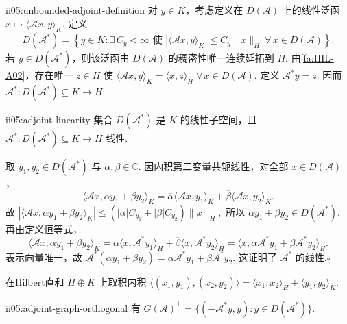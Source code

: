 \begin{FADefinition}[A][无界Hilbert伴随]{ii05:unbounded-adjoint-definition}
对 \(\displaystyle y\in K\)，考虑定义在 \(\displaystyle D(\mathcal A)\) 上的线性泛函
\(\displaystyle x\longmapsto\langle\mathcal Ax,y\rangle_K.\)
定义
\[
D(\mathcal A^*)
=
\left\{
y\in K:
\exists\,C_y<\infty\text{ 使 }
|\langle\mathcal Ax,y\rangle_K|
\leqslant
C_y\|x\|_H
\ \forall\,x\in D(\mathcal A)
\right\}.
\]
若 \(\displaystyle y\in D(\mathcal A^*)\)，则该泛函由 \(\displaystyle D(\mathcal A)\) 的稠密性唯一连续延拓到 \(\displaystyle H\). 由\autoref{fa:HIL-A02}，存在唯一 \(\displaystyle z\in H\) 使
\(\displaystyle \langle\mathcal Ax,y\rangle_K = \langle x,z\rangle_H \;\forall\,x\in D(\mathcal A).\)
定义 \(\displaystyle\mathcal A^*y=z\). 因而
\(\displaystyle \mathcal A^*:D(\mathcal A^*)\subseteq K\to H.\)
\end{FADefinition}

\begin{FAProposition}[C][伴随定义域与线性结构]{ii05:adjoint-linearity}
集合 \(\displaystyle D(\mathcal A^*)\) 是 \(\displaystyle K\) 的线性子空间，且 \(\displaystyle\mathcal A^*:D(\mathcal A^*)\subseteq K\to H\) 线性.
\end{FAProposition}

\begin{FAProof}
取 \(\displaystyle y_1,y_2\in D(\mathcal A^*)\) 与 \(\displaystyle\alpha,\beta\in\mathbb C\). 因内积第二变量共轭线性，对全部 \(\displaystyle x\in D(\mathcal A)\)，
\[
\langle\mathcal Ax,\alpha y_1+\beta y_2\rangle_K
=
\overline\alpha\langle\mathcal Ax,y_1\rangle_K
+
\overline\beta\langle\mathcal Ax,y_2\rangle_K.
\]
故
\(\displaystyle |\langle\mathcal Ax,\alpha y_1+\beta y_2\rangle_K| \leqslant (|\alpha|C_{y_1}+|\beta|C_{y_2})\|x\|_H,\)
所以 \(\displaystyle\alpha y_1+\beta y_2\in D(\mathcal A^*)\). 再由定义恒等式，
\[
\langle\mathcal Ax,\alpha y_1+\beta y_2\rangle_K
=
\overline\alpha\langle x,\mathcal A^*y_1\rangle_H
+
\overline\beta\langle x,\mathcal A^*y_2\rangle_H
=
\langle x,\alpha\mathcal A^*y_1+\beta\mathcal A^*y_2\rangle_H.
\]
表示向量唯一，故
\(\displaystyle \mathcal A^*(\alpha y_1+\beta y_2) = \alpha\mathcal A^*y_1+\beta\mathcal A^*y_2.\)
这证明了 \(\displaystyle\mathcal A^*\) 的线性.\hfill\(\square\)
\end{FAProof}

在Hilbert直和 \(\displaystyle H\oplus K\) 上取积内积
\(\displaystyle \langle(x_1,y_1),(x_2,y_2)\rangle = \langle x_1,x_2\rangle_H+\langle y_1,y_2\rangle_K.\)

\begin{FAProposition}[B][伴随的图正交恒等式]{ii05:adjoint-graph-orthogonal}
有
\(\displaystyle G(\mathcal A)^\perp = \{(-\mathcal A^*y,y):y\in D(\mathcal A^*)\}.\)
\end{FAProposition}

